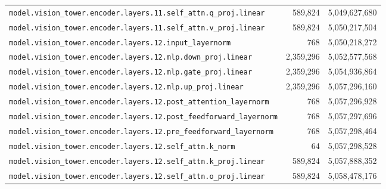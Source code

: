 \documentclass[10pt,a4paper]{article}
\theoremstyle{definition}
\begin{document}
\begin{appendices}
\begin{longtable}{p{9.5cm}rr}
\texttt{model.\allowbreak{}vision\_tower.\allowbreak{}encoder.\allowbreak{}layers.\allowbreak{}11.\allowbreak{}self\_attn.\allowbreak{}q\_proj.\allowbreak{}linear} & 589,824 & 5,049,627,680 \\
\texttt{model.\allowbreak{}vision\_tower.\allowbreak{}encoder.\allowbreak{}layers.\allowbreak{}11.\allowbreak{}self\_attn.\allowbreak{}v\_proj.\allowbreak{}linear} & 589,824 & 5,050,217,504 \\
\texttt{model.\allowbreak{}vision\_tower.\allowbreak{}encoder.\allowbreak{}layers.\allowbreak{}12.\allowbreak{}input\_layernorm} & 768 & 5,050,218,272 \\
\texttt{model.\allowbreak{}vision\_tower.\allowbreak{}encoder.\allowbreak{}layers.\allowbreak{}12.\allowbreak{}mlp.\allowbreak{}down\_proj.\allowbreak{}linear} & 2,359,296 & 5,052,577,568 \\
\texttt{model.\allowbreak{}vision\_tower.\allowbreak{}encoder.\allowbreak{}layers.\allowbreak{}12.\allowbreak{}mlp.\allowbreak{}gate\_proj.\allowbreak{}linear} & 2,359,296 & 5,054,936,864 \\
\texttt{model.\allowbreak{}vision\_tower.\allowbreak{}encoder.\allowbreak{}layers.\allowbreak{}12.\allowbreak{}mlp.\allowbreak{}up\_proj.\allowbreak{}linear} & 2,359,296 & 5,057,296,160 \\
\texttt{model.\allowbreak{}vision\_tower.\allowbreak{}encoder.\allowbreak{}layers.\allowbreak{}12.\allowbreak{}post\_attention\_layernorm} & 768 & 5,057,296,928 \\
\texttt{model.\allowbreak{}vision\_tower.\allowbreak{}encoder.\allowbreak{}layers.\allowbreak{}12.\allowbreak{}post\_feedforward\_layernorm} & 768 & 5,057,297,696 \\
\texttt{model.\allowbreak{}vision\_tower.\allowbreak{}encoder.\allowbreak{}layers.\allowbreak{}12.\allowbreak{}pre\_feedforward\_layernorm} & 768 & 5,057,298,464 \\
\texttt{model.\allowbreak{}vision\_tower.\allowbreak{}encoder.\allowbreak{}layers.\allowbreak{}12.\allowbreak{}self\_attn.\allowbreak{}k\_norm} & 64 & 5,057,298,528 \\
\texttt{model.\allowbreak{}vision\_tower.\allowbreak{}encoder.\allowbreak{}layers.\allowbreak{}12.\allowbreak{}self\_attn.\allowbreak{}k\_proj.\allowbreak{}linear} & 589,824 & 5,057,888,352 \\
\texttt{model.\allowbreak{}vision\_tower.\allowbreak{}encoder.\allowbreak{}layers.\allowbreak{}12.\allowbreak{}self\_attn.\allowbreak{}o\_proj.\allowbreak{}linear} & 589,824 & 5,058,478,176 \\

\end{longtable}
\end{appendices}
\end{document}
